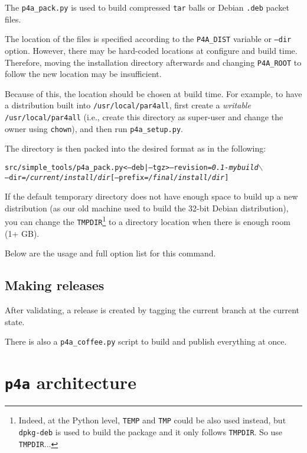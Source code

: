\documentclass[a4paper]{article}
\begin{document}
The \verb|p4a_pack.py| is used to build compressed \texttt{tar} balls or Debian
\texttt{.deb} packet files.

The location of the \Apfa files is specified according
to the \verb|P4A_DIST| variable or \texttt{--dir} option. However, there may be
hard-coded locations at configure and build time. Therefore, moving the
installation directory afterwards and changing \verb|P4A_ROOT| to follow
the new location may be insufficient.

Because of this, the location should be chosen at build time. For
example, to have a distribution built
into \texttt{/usr/local/par4all},
first create a \emph{writable} \texttt{/usr/local/par4all} (i.e.,
create this directory as super-user and change the owner using
\texttt{chown}), and then run \verb|p4a_setup.py|.

The directory is then packed into the desired format as in the
following:
\begin{alltt}
src/simple_tools/p4a_pack.py <--deb|--tgz> --revision=\emph{0.1-mybuild} \(\backslash\)
  --dir=\emph{/current/install/dir} [--prefix=\emph{/final/install/dir}]
\end{alltt}

If the default temporary directory does not have enough space to build up a new
distribution (as our old machine used to build the 32-bit Debian
distribution), you can change the \texttt{TMPDIR}\footnote{Indeed, at the
  Python level, \texttt{TEMP} and \texttt{TMP} could be also used instead,
  but \texttt{dpkg-deb} is used to build the package and it only follows
  \texttt{TMPDIR}. So use \texttt{TMPDIR}...} to a directory location when
there is enough room (1+ GB).

Below are the usage and full option list for this command.





\subsection{Making releases}
\label{sec:releases}

After validating, a release is created by tagging the current branch
at the current state.

There is also a \verb|p4a_coffee.py| script to build and publish everything
at once.




\section{\protect\texttt{p4a} architecture}
\label{sec:p4a-architecture}
\end{document}
